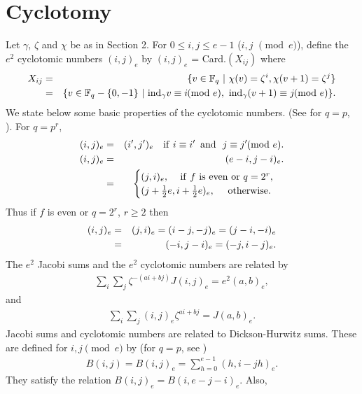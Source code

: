 \documentclass[a4paper,12pt]{article}
\def\F{{\mathbb F}}
\def\vpmod{\!\!\!\pmod}
\begin{document}
\section{Cyclotomy}
Let $\gamma$, $\zeta$ and $\chi$ be as in Section 2. For $ 0 \leq i, j \leq e - 1$ ($i,j\,\,\vpmod e$), define the $e^{2}$ cyclotomic numbers $(i,j)_{e}$ by $(i,j)_{e}$ = Card.$(X_{ij})$ where
\begin{eqnarray*} 
X_{i j}&=&\{v \in \F_{q}\,\, |\,\, \chi(v) = \zeta^{i}, \chi(v + 1) = \zeta^{j}\}\\
&=& \{v \in \F_{q}- \{0, -1\}\,\, | \,\, {\rm{ind}}_\gamma v \equiv i\vpmod{e},\,\, \textrm{ind}_\gamma (v + 1) \equiv j \vpmod{e}\}.
\end{eqnarray*}  
We state below some basic properties of the cyclotomic numbers. (See \cite{3} for $q=p$, \cite{16}). For $q =p^r$,
\begin{eqnarray*}
(i,j)_{e}& =& (i',j')_{e}\,\,\,\,\,\,{\rm{if}}\,\, i\equiv i' \,\,\,{\rm{and}}\,\,\,\, j \equiv j'\vpmod{e}.\\
(i,j)_{e} &=& (e-i,j-i)_{e}.\\
&=& \begin{cases}
(j,i)_{e},\,\,\,\,\,\,\,{\rm{if}}\,\,f \,\,{\rm{is \,\,even}} \,\,{\rm{or}}\,\,q = 2^r,\\
(j+\frac{1}{2}e, i+\frac{1}{2}e)_{e},\,\,\,\,\,\,\,\,{\rm{otherwise.}}
\end{cases}
\end{eqnarray*} 
Thus if $f$ is even or $q =2^r$, $r\geq 2$ then
\begin{eqnarray}\label{eq:1}
(i,j)_e&=&(j,i)_e=(i-j,-j)_e =(j-i,-i)_e\notag\\
&=&(-i,j-i)_e=(-j,i-j)_e.
\end{eqnarray} 
The $e^{2}$ Jacobi sums and the $e^2$ cyclotomic numbers are related by
\begin{eqnarray}\label{eq:2}
\sum_{i}\sum_{j} \zeta^{-(ai+bj)}J(i,j)_{e} = e^2(a,b)_e ,
\end{eqnarray}
\noindent and
\begin{eqnarray}\label{eq:3}
\sum_{i}\sum_{j}(i,j)_e\zeta^{ai+bj} = J(a,b)_{e}.
\end{eqnarray}
Jacobi sums and cyclotomic numbers are related to Dickson-Hurwitz sums. These are defined for $i, j \pmod{e}$ by  (for $q = p$, see \cite{2})
\begin{eqnarray}\label{eq:4}
 B(i,j) = B(i,j)_{e}= \sum_{h=0}^{e-1}(h,i-jh)_e.
\end{eqnarray}
\noindent They satisfy the relation $B(i,j)_{e} = B(i,e-j-i)_{e}$. Also,
\end{document}
